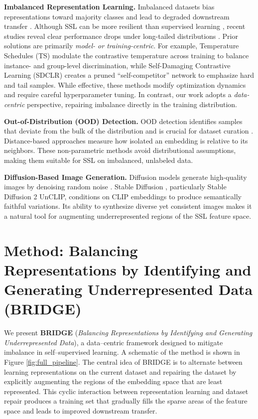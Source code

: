 \documentclass{article} %
\begin{document}
\noindent
\textbf{Imbalanced Representation Learning.} 
Imbalanced datasets bias representations toward majority classes and lead to degraded downstream transfer \citep{johnson2019survey}. Although SSL can be more resilient than supervised learning \citep{liu2021self}, recent studies reveal clear performance drops under long-tailed distributions \citep{assran2210hidden, tian2021divide}. Prior solutions are primarily \emph{model- or training-centric}. For example, Temperature Schedules (TS) \citep{ts} modulate the contrastive temperature across training to balance instance- and group-level discrimination, while Self-Damaging Contrastive Learning (SDCLR) \citep{sdclr} creates a pruned ``self-competitor'' network to emphasize hard and tail samples. While effective, these methods modify optimization dynamics and require careful hyperparameter tuning. In contrast, our work adopts a \emph{data-centric} perspective, repairing imbalance directly in the training distribution.

\noindent
\textbf{Out-of-Distribution (OOD) Detection.} 
OOD detection identifies samples that deviate from the bulk of the distribution and is crucial for dataset curation \citep{whang2023data}. Distance-based approaches \citep{sun2022out} measure how isolated an embedding is relative to its neighbors. These non-parametric methods avoid distributional assumptions, making them suitable for SSL on imbalanced, unlabeled data.

\noindent
\textbf{Diffusion-Based Image Generation.} 
Diffusion models generate high-quality images by denoising random noise \citep{ho2020denoising}. Stable Diffusion \citep{rombach2022highresolution}, particularly Stable Diffusion 2 UnCLIP, conditions on CLIP embeddings to produce semantically faithful variations. Its ability to synthesize diverse yet consistent images makes it a natural tool for augmenting underrepresented regions of the SSL feature space.



\section{Method: Balancing Representations by Identifying and Generating Underrepresented Data (BRIDGE)}
\label{sec:method}

We present \textbf{BRIDGE} (\textit{Balancing Representations by Identifying and Generating Underrepresented Data}), a data–centric framework designed to mitigate imbalance in self–supervised learning. A schematic of the method is shown in Figure \ref{fig:full_pipeline}. The central idea of BRIDGE is to alternate between learning representations on the current dataset and repairing the dataset by explicitly augmenting the regions of the embedding space that are least represented. This cyclic interaction between representation learning and dataset repair produces a training set that gradually fills the sparse areas of the feature space and leads to improved downstream transfer. 
\end{document}
